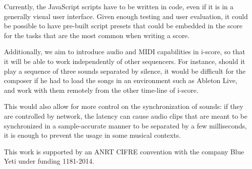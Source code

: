 \documentclass{article}
\begin{document}
Currently, the JavaScript scripts have to be written in code, even if it 
is in a generally visual user interface. 
Given enough testing and user evaluation, it could be possible to have pre-built script presets 
that could be embedded in the score for the tasks that are the most common when writing a score.

Additionally, we aim to introduce audio and MIDI capabilities in i-score, so that 
it will be able to work independently of other sequencers.
For instance, should it play a sequence of three sounds separated by silence, 
it would be difficult for the composer if he had to load 
the songs in an environment such as Ableton Live, and work with them remotely from the other time-line of i-score.

This would also allow for more control on the synchronization of sounds: if they are controlled by network, 
the latency can cause audio clips that are meant to be synchronized in a sample-accurate manner to be separated by a few milliseconds, it is enough to prevent the usage in some musical contexts.

\begin{acknowledgments}
	This work is supported by an ANRT CIFRE convention with the company Blue Yeti under funding 1181-2014.    
\end{acknowledgments} 


\end{document}
